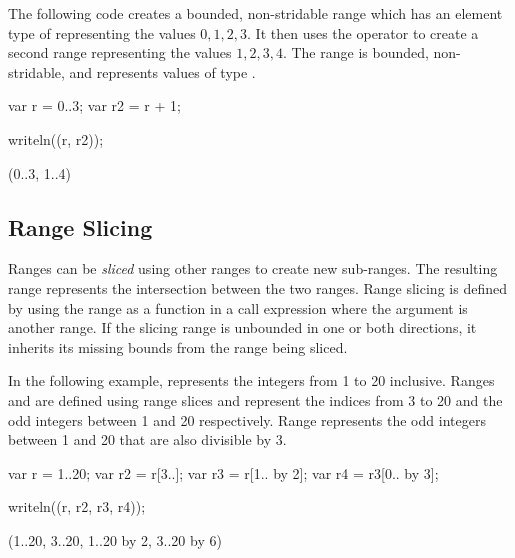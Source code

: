 \begin{example}
The following code creates a bounded, non-stridable range 
which has an element type of  representing the values ${0,
  1, 2, 3}$.  It then uses the \chpl{+} operator to
create a second range  representing the values ${1, 2, 3,
  4}$.  The  range is bounded, non-stridable, and represents
values of type .
\begin{chapelpre}
\end{chapelpre}
\begin{chapel}
var r = 0..3;
var r2 = r + 1;
\end{chapel}
\begin{chapelpost}
writeln((r, r2));
\end{chapelpost}
\begin{chapeloutput}
(0..3, 1..4)
\end{chapeloutput}
\end{example}


\subsection{Range Slicing}
\label{Range_Slicing}

Ranges can be \emph{sliced} using other ranges to create new
sub-ranges.  The resulting range represents the intersection between
the two ranges.  Range slicing is defined by using the range as a
function in a call expression where the argument is another range.
If the slicing range is unbounded in one or both directions, it
inherits its missing bounds from the range being sliced.

\begin{example}
In the following example,  represents the integers from 1 to
20 inclusive.  Ranges  and  are defined using range
slices and represent the indices from 3 to 20 and the odd integers
between 1 and 20 respectively. Range  represents the odd
integers between 1 and 20 that are also divisible by 3.
\begin{chapelpre}
\end{chapelpre}
\begin{chapel}
var r = 1..20;
var r2 = r[3..];
var r3 = r[1.. by 2];
var r4 = r3[0.. by 3];
\end{chapel}
\begin{chapelpost}
writeln((r, r2, r3, r4));
\end{chapelpost}
\begin{chapeloutput}
(1..20, 3..20, 1..20 by 2, 3..20 by 6)
\end{chapeloutput}
\end{example}

